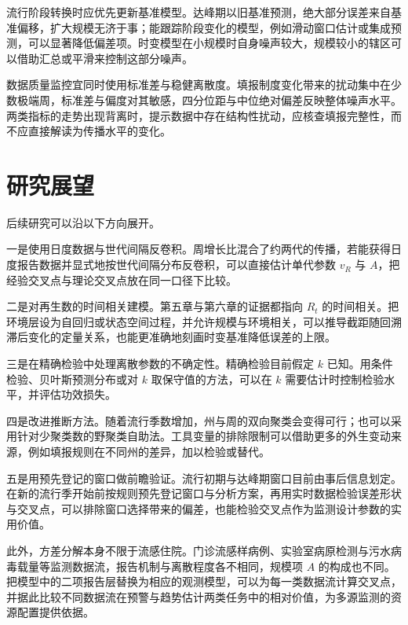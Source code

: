 流行阶段转换时应优先更新基准模型。达峰期以旧基准预测，绝大部分误差来自基准偏移，扩大规模无济于事；能跟踪阶段变化的模型，例如滑动窗口估计或集成预测，可以显著降低偏差项。时变模型在小规模时自身噪声较大，规模较小的辖区可以借助汇总或平滑来控制这部分噪声。

数据质量监控宜同时使用标准差与稳健离散度。填报制度变化带来的扰动集中在少数极端周，标准差与偏度对其敏感，四分位距与中位绝对偏差反映整体噪声水平。两类指标的走势出现背离时，提示数据中存在结构性扰动，应核查填报完整性，而不应直接解读为传播水平的变化。

\section{研究展望}
\label{sec:concl-outlook}

后续研究可以沿以下方向展开。

一是使用日度数据与世代间隔反卷积。周增长比混合了约两代的传播，若能获得日度报告数据并显式地按世代间隔分布反卷积，可以直接估计单代参数 $v_R$ 与 $A$，把经验交叉点与理论交叉点放在同一口径下比较。

二是对再生数的时间相关建模。第五章与第六章的证据都指向 $R_t$ 的时间相关。把环境层设为自回归或状态空间过程，并允许规模与环境相关，可以推导截距随回溯滞后变化的定量关系，也能更准确地刻画时变基准降低误差的上限。

三是在精确检验中处理离散参数的不确定性。精确检验目前假定 $k$ 已知。用条件检验、贝叶斯预测分布或对 $k$ 取保守值的方法，可以在 $k$ 需要估计时控制检验水平，并评估功效损失。

四是改进推断方法。随着流行季数增加，州与周的双向聚类会变得可行；也可以采用针对少聚类数的野聚类自助法\citep{cameron2008bootstrap}。工具变量的排除限制可以借助更多的外生变动来源，例如填报规则在不同州的差异，加以检验或替代。

五是用预先登记的窗口做前瞻验证。流行初期与达峰期窗口目前由事后信息划定。在新的流行季开始前按规则预先登记窗口与分析方案，再用实时数据检验误差形状与交叉点，可以排除窗口选择带来的偏差，也能检验交叉点作为监测设计参数的实用价值。

此外，方差分解本身不限于流感住院。门诊流感样病例、实验室病原检测与污水病毒载量等监测数据流，报告机制与离散程度各不相同，规模项 $A$ 的构成也不同。把模型中的二项报告层替换为相应的观测模型，可以为每一类数据流计算交叉点，并据此比较不同数据流在预警与趋势估计两类任务中的相对价值，为多源监测的资源配置提供依据。
